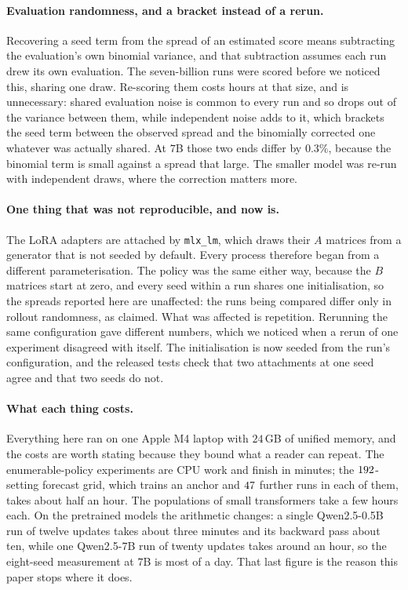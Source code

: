 \paragraph{Evaluation randomness, and a bracket instead of a rerun.} Recovering a seed term from
the spread of an estimated score means subtracting the evaluation's own binomial variance, and that
subtraction assumes each run drew its own evaluation. The seven-billion runs were scored before we
noticed this, sharing one draw. Re-scoring them costs hours at that size, and is unnecessary: shared
evaluation noise is common to every run and so drops out of the variance between them, while
independent noise adds to it, which brackets the seed term between the observed spread and the
binomially corrected one whatever was actually shared. At $7$B those two ends differ by $0.3\%$,
because the binomial term is small against a spread that large. The smaller model was re-run with
independent draws, where the correction matters more.

\paragraph{One thing that was not reproducible, and now is.} The LoRA adapters are attached by
\texttt{mlx\_lm}, which draws their $A$ matrices from a generator that is not seeded by default.
Every process therefore began from a different parameterisation. The policy was the same either way,
because the $B$ matrices start at zero, and every seed within a run shares one initialisation, so
the spreads reported here are unaffected: the runs being compared differ only in rollout randomness,
as claimed. What was affected is repetition. Rerunning the same configuration gave different
numbers, which we noticed when a rerun of one experiment disagreed with itself. The initialisation
is now seeded from the run's configuration, and the released tests check that two attachments at one
seed agree and that two seeds do not.

\paragraph{What each thing costs.} Everything here ran on one Apple M4 laptop with $24$\,GB of
unified memory, and the costs are worth stating because they bound what a reader can repeat. The
enumerable-policy experiments are CPU work and finish in minutes; the $192$-setting
forecast grid, which trains an anchor and $47$ further runs in each of them, takes
about half an hour. The
populations of small transformers take a few hours each. On the pretrained models the arithmetic
changes: a single Qwen2.5-0.5B run of twelve updates takes about three minutes and its backward
pass about ten, while one Qwen2.5-7B run of twenty updates takes around an hour, so the eight-seed
measurement at $7$B is most of a day. That last figure is the reason this paper stops where it
does.

